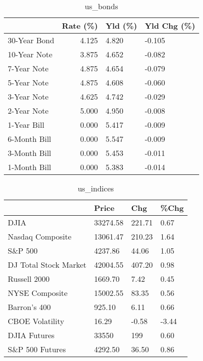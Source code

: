 \documentclass{article}%
\begin{document}
%


\begin{table}[htbp]%
\caption{us\_bonds}%
\centering%
\begin{adjustbox}{width=1\textwidth}%
\begin{tabular}{lrll}
\toprule
             &  Rate (\%) & Yld (\%) & Yld Chg (\%) \\
\midrule
30-Year Bond &     4.125 &   4.820 &      -0.105 \\
10-Year Note &     3.875 &   4.652 &      -0.082 \\
 7-Year Note &     4.875 &   4.654 &      -0.079 \\
 5-Year Note &     4.875 &   4.608 &      -0.060 \\
 3-Year Note &     4.625 &   4.742 &      -0.029 \\
 2-Year Note &     5.000 &   4.950 &      -0.008 \\
 1-Year Bill &     0.000 &   5.417 &      -0.009 \\
6-Month Bill &     0.000 &   5.547 &      -0.009 \\
3-Month Bill &     0.000 &   5.453 &      -0.011 \\
1-Month Bill &     0.000 &   5.383 &      -0.014 \\
\bottomrule
\end{tabular}
%
\end{adjustbox}%
\end{table}

%


\begin{table}[htbp]%
\caption{us\_indices}%
\centering%
\begin{adjustbox}{width=1\textwidth}%
\begin{tabular}{llll}
\toprule
                      &    Price &    Chg &  \%Chg \\
\midrule
                 DJIA & 33274.58 & 221.71 &  0.67 \\
     Nasdaq Composite & 13061.47 & 210.23 &  1.64 \\
              S\&P 500 &  4237.86 &  44.06 &  1.05 \\
DJ Total Stock Market & 42004.55 & 407.20 &  0.98 \\
         Russell 2000 &  1669.70 &   7.42 &  0.45 \\
       NYSE Composite & 15002.55 &  83.35 &  0.56 \\
         Barron's 400 &   925.10 &   6.11 &  0.66 \\
      CBOE Volatility &    16.29 &  -0.58 & -3.44 \\
         DJIA Futures &    33550 &    199 &  0.60 \\
      S\&P 500 Futures &  4292.50 &  36.50 &  0.86 \\
\bottomrule
\end{tabular}
%
\end{adjustbox}%
\end{table}
\end{document}
